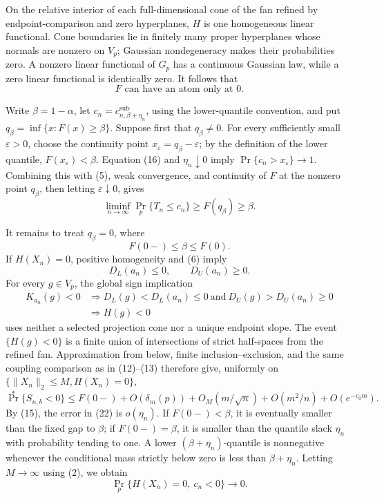 On the relative interior of each full-dimensional cone of the fan refined by endpoint-comparison and zero hyperplanes, \(H\) is one homogeneous linear functional.  Cone boundaries lie in finitely many proper hyperplanes whose normals are nonzero on \(V_p\); Gaussian nondegeneracy makes their probabilities zero.  A nonzero linear functional of \(G_p\) has a continuous Gaussian law, while a zero linear functional is identically zero.  It follows that
\[
F\text{ can have an atom only at }0.
\tag{17}
\]

Write \(\beta=1-\alpha\), let \(c_n=c^{\mathrm{sub}}_{n,\beta+\eta_n}\), using the lower-quantile convention, and put \(q_\beta=\inf\{x:F(x)\geq\beta\}\).  Suppose first that \(q_\beta\neq0\).  For every sufficiently small \(\varepsilon>0\), choose the continuity point \(x_\varepsilon=q_\beta-\varepsilon\); by the definition of the lower quantile, \(F(x_\varepsilon)<\beta\).  Equation (16) and \(\eta_n\downarrow0\) imply \(\Pr\{c_n>x_\varepsilon\}\to1\).  Combining this with (5), weak convergence, and continuity of \(F\) at the nonzero point \(q_\beta\), then letting \(\varepsilon\downarrow0\), gives
\[
\liminf_{n\to\infty}\Pr_p\{T_n\leq c_n\}
\geq F(q_\beta)\geq\beta.
\tag{18}
\]

It remains to treat \(q_\beta=0\), where
\[
F(0-)\leq\beta\leq F(0).
\tag{19}
\]
If \(H(X_n)=0\), positive homogeneity and (6) imply
\[
D_L(a_n)\leq0,
\qquad
D_U(a_n)\geq0.
\tag{20}
\]
For every \(g\in V_p\), the global sign implication
\[
\begin{aligned}
K_{a_n}(g)<0
&\Longrightarrow D_L(g)<D_L(a_n)\leq0
\ \text{and}\ D_U(g)>D_U(a_n)\geq0\\
&\Longrightarrow H(g)<0
\end{aligned}
\tag{21}
\]
uses neither a selected projection cone nor a unique endpoint slope.  The event \(\{H(g)<0\}\) is a finite union of intersections of strict half-spaces from the refined fan.  Approximation from below, finite inclusion--exclusion, and the same coupling comparison as in (12)--(13) therefore give, uniformly on \(\{\|X_n\|_2\leq M,H(X_n)=0\}\),
\[
\Pr^*\{S_{n,b}<0\}
\leq F(0-)+O(\delta_m(p))+O_M(m/\sqrt n)
+O(m^2/n)+O(e^{-c_0m}).
\tag{22}
\]
By (15), the error in (22) is \(o(\eta_n)\).  If \(F(0-)<\beta\), it is eventually smaller than the fixed gap to \(\beta\); if \(F(0-)=\beta\), it is smaller than the quantile slack \(\eta_n\) with probability tending to one.  A lower \((\beta+\eta_n)\)-quantile is nonnegative whenever the conditional mass strictly below zero is less than \(\beta+\eta_n\).  Letting \(M\to\infty\) using (2), we obtain
\[
\Pr_p\{H(X_n)=0,\ c_n<0\}\longrightarrow0.
\tag{23}
\]

